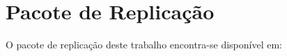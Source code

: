 \section*{Pacote de Replicação}

O pacote de replicação deste trabalho encontra-se disponível em:
\repositorioTCC
